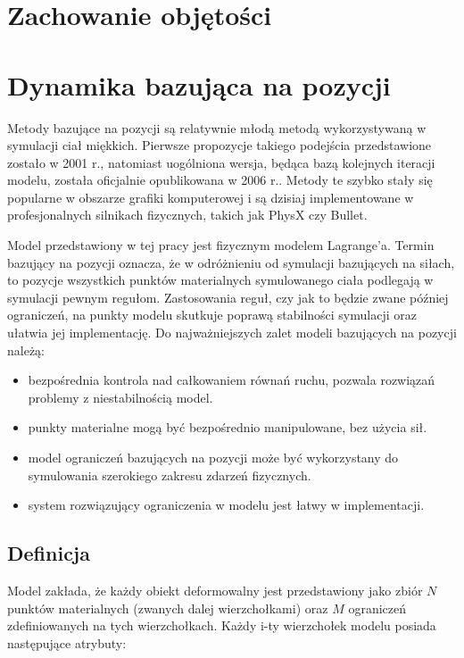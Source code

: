 \section{Zachowanie objętości}
\section{Dynamika bazująca na pozycji}

Metody bazujące na pozycji są relatywnie młodą metodą wykorzystywaną w symulacji
ciał miękkich. Pierwsze propozycje takiego podejścia przedstawione zostało w
2001 r.\cite{jak}, natomiast uogólniona wersja, będąca bazą kolejnych
iteracji modelu, została oficjalnie opublikowana w 2006 r.\cite{pbdyn}. Metody te
szybko stały się popularne w obszarze grafiki komputerowej i są dzisiaj
implementowane w profesjonalnych silnikach fizycznych, takich jak PhysX czy
Bullet.

Model przedstawiony w tej pracy jest fizycznym modelem Lagrange'a. Termin
bazujący na pozycji oznacza, że w odróżnieniu od symulacji bazujących na siłach, to pozycje
wszystkich punktów materialnych symulowanego ciała podlegają w symulacji pewnym
regułom. Zastosowania reguł, czy jak to będzie zwane później ograniczeń, na
punkty modelu skutkuje poprawą stabilności symulacji oraz ułatwia jej
implementację. Do najważniejszych zalet modeli bazujących na pozycji należą:
\begin{itemize}
	\item bezpośrednia kontrola nad całkowaniem równań ruchu, pozwala rozwiązań
	problemy z niestabilnością model.
	\item punkty materialne mogą być bezpośrednio manipulowane, bez użycia sił.
	\item model ograniczeń bazujących na pozycji może być wykorzystany do
	symulowania szerokiego zakresu zdarzeń fizycznych.
	\item system rozwiązujący ograniczenia w modelu jest łatwy w implementacji.
\end{itemize}

\subsection{Definicja}
Model zakłada, że każdy obiekt deformowalny jest przedstawiony jako zbiór $N$
punktów materialnych (zwanych dalej wierzchołkami) oraz $M$ ograniczeń
zdefiniowanych na tych wierzchołkach. Każdy i-ty wierzchołek modelu posiada
następujące atrybuty:

